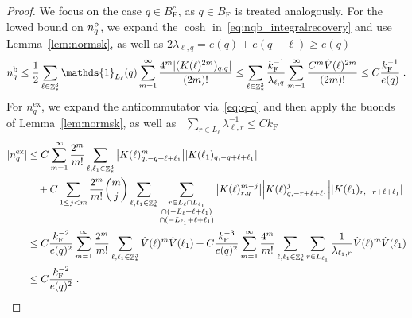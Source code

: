 \documentclass[12pt,a4paper]{article}
\numberwithin{equation}{section}
\newcommand{\1}{\mathbb{I}}
\renewcommand{\b}{\textnormal{b}}
\newcommand{\ex}{\mathrm{ex}}
\newcommand{\F}{\mathrm{F}}
\DeclareMathOperator{\Z}{\mathbb{Z}}
\newcommand{\half}{\frac{1}{2}}
\theoremstyle{plain}
\theoremstyle{definition}
\theoremstyle{remark}
\theoremstyle{plain}
\theoremstyle{definition}
\theoremstyle{remark}
\begin{document}
\begin{proof}
We focus on the case $ q \in B_{\F}^c $, as $ q \in B_{\F} $ is treated analogously. For the lowed bound on $ n_q^{\b} $, we expand the $ \cosh $ in~\eqref{eq:nqb_integralrecovery} and use Lemma~\ref{lem:normsk}, as well as $ 2 \lambda_{\ell,q} = e(q) + e(q - \ell) \ge e(q) $
\begin{equation}
	n_q^{\b}
	\le \half \sum_{\ell \in \Z^3_*} \mathds{1}_{L_\ell}(q) \sum_{m=1}^{\infty} \frac{4^m |(K(\ell)^{2m})_{q,q}|}{(2m)!}
	\le \sum_{\ell \in \Z^3_*} \frac{k_{\F}^{-1}}{\lambda_{\ell,q}} \sum_{m=1}^{\infty} \frac{C^m \hat{V}(\ell)^{2m}}{(2m)!}
	\le C \frac{k_{\F}^{-1}}{e(q)} \;.
\end{equation}
For $ n_q^{\ex} $, we expand the anticommutator via~\eqref{eq:q-q} and then apply the buonds of Lemma~\ref{lem:normsk}, as well as~\cite[Prop.~A.2]{CHN21} $ \sum_{r \in L_\ell} \lambda_{\ell,r}^{-1} \le C k_{\F} $
\begin{equation}
\begin{aligned}
	|n_q^{\ex}|
	&\le C \sum_{m=1}^\infty \frac{2^m}{m!} \sum_{\ell,\ell_1 \in \Z^3_*}
		\abs{K(\ell)^m_{q,-q+\ell+\ell_1}}
		\abs{K(\ell_1)_{q,-q+\ell+\ell_1}} \\
		&\quad + C \sum_{1 \le j < m} \frac{2^m}{m!} {{m}\choose j} \sum_{\ell,\ell_1 \in \Z^3_*}
		\sum_{\substack{r\in L_{\ell} \cap L_{\ell_1}\\ \cap (-L_{\ell}+\ell+\ell_1) \\ \cap (-L_{\ell_1}+\ell+\ell_1 )}}
		\abs{K(\ell)^{m-j}_{r,q}}
		\abs{K(\ell)^j_{q,-r+\ell+\ell_1}}
		\abs{K(\ell_1)_{r,-r+\ell+\ell_1}} \\
	&\le C \frac{k_{\F}^{-2}}{e(q)^2} \sum_{m=1}^\infty \frac{2^m}{m!} \sum_{\ell,\ell_1 \in \Z^3_*}
		\hat{V}(\ell)^m
		\hat{V}(\ell_1)
	+ C \frac{k_{\F}^{-3}}{e(q)^2} \sum_{m=1}^\infty \frac{4^m}{m!} \sum_{\ell,\ell_1 \in \Z^3_*}
		\sum_{r\in L_{\ell_1}}
		\frac{1}{\lambda_{\ell_1,r}}
		\hat{V}(\ell)^m
		\hat{V}(\ell_1) \\
	&\le C \frac{k_{\F}^{-2}}{e(q)^2} \;.
\end{aligned}
\end{equation}


\end{proof}
\end{document}
